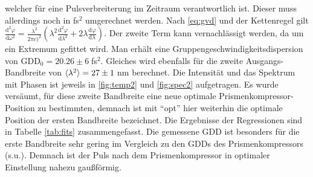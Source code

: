 \documentclass[twoside,        %
               BCOR12mm,       %
               english,ngerman, %
               fleqn,headsepline=false,footsepline=false
              ]{Vorlage/MFPREPORT}
\renewcommand{\d}{\ensuremath{\mathrm{d}}} %
\newcommand{\diff}[3][]{\ensuremath{\frac{\d^{#1}#2}{\d#3^{#1}}}} %
\begin{document}
welcher für eine Pulsverbreiterung im Zeitraum verantwortlich ist.
Dieser muss allerdings noch in fs$^2$ umgerechnet werden. Nach \cref{eq:gvd}
und der Kettenregel gilt $\diff[2]{\varphi}{\omega}=\frac{\lambda^2}{2\pi c)^2}\left(
\lambda^2\diff[2]{\varphi}{\lambda}+2\lambda\diff{\varphi}{\lambda} \right)$.
Der zweite Term kann vernachlässigt werden, da um ein Extremum gefittet wird. Man
erhält eine Gruppengeschwindigkeitsdispersion von GDD$_0=20.26\pm6\;$fs$^2$.
Gleiches wird ebenfalls für die zweite Ausgangs-Bandbreite von
$\braket{\lambda^2}=27\pm1\;$nm berechnet. Die Intensität und das Spektrum mit Phasen
ist jeweils in \cref{fig:temp2} und \cref{fig:spec2} aufgetragen. Es wurde
versäumt, für diese zweite Bandbreite eine neue optimale
Prismenkompressor-Position zu bestimmten, demnach ist mit ``opt'' hier weiterhin
die optimale Position der ersten Bandbreite bezeichnet.
Die Ergebnisse der Regressionen sind in Tabelle \cref{tab:fits}
zusammengefasst. Die gemessene GDD ist besonders für die erste Bandbreite sehr
gering im Vergleich zu den GDDs des Prismenkompressors (s.u.). Demnach ist der
Puls nach dem Prismenkompressor in optimaler Einstellung nahezu gaußförmig.
\end{document}
